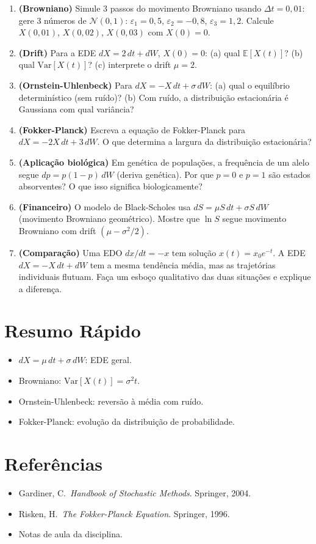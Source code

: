 \documentclass[12pt,a4paper]{article}
\begin{document}
\begin{enumerate}
  \item \textbf{(Browniano)} Simule 3 passos do movimento Browniano usando $\Delta t=0{,}01$: gere 3 n\'umeros de $\mathcal{N}(0,1)$: $\varepsilon_1=0{,}5$, $\varepsilon_2=-0{,}8$, $\varepsilon_3=1{,}2$. Calcule $X(0{,}01)$, $X(0{,}02)$, $X(0{,}03)$ com $X(0)=0$.
  
  \item \textbf{(Drift)} Para a EDE $dX = 2\,dt + dW$, $X(0)=0$: (a) qual $\mathbb{E}[X(t)]$? (b) qual $\text{Var}[X(t)]$? (c) interprete o drift $\mu=2$.
  
  \item \textbf{(Ornstein-Uhlenbeck)} Para $dX = -X\,dt + \sigma\,dW$: (a) qual o equil\'ibrio determin\'istico (sem ru\'ido)? (b) Com ru\'ido, a distribui\c{c}\~ao estacion\'aria \'e Gaussiana com qual vari\^ancia?
  
  \item \textbf{(Fokker-Planck)} Escreva a equa\c{c}\~ao de Fokker-Planck para $dX = -2X\,dt + 3\,dW$. O que determina a largura da distribui\c{c}\~ao estacion\'aria?
  
  \item \textbf{(Aplica\c{c}\~ao biol\'ogica)} Em gen\'etica de popula\c{c}\~oes, a frequ\^encia de um alelo segue $dp = p(1-p)\,dW$ (deriva gen\'etica). Por que $p=0$ e $p=1$ s\~ao estados absorventes? O que isso significa biologicamente?
  
  \item \textbf{(Financeiro)} O modelo de Black-Scholes usa $dS = \mu S\,dt + \sigma S\,dW$ (movimento Browniano geom\'etrico). Mostre que $\ln S$ segue movimento Browniano com drift $(\mu - \sigma^2/2)$.
  
  \item \textbf{(Compara\c{c}\~ao)} Uma EDO $dx/dt = -x$ tem solu\c{c}\~ao $x(t)=x_0 e^{-t}$. A EDE $dX = -X\,dt + dW$ tem a mesma tend\^encia m\'edia, mas as trajet\'orias individuais flutuam. Fa\c{c}a um esbo\c{c}o qualitativo das duas situa\c{c}\~oes e explique a diferen\c{c}a.
\end{enumerate}

\section*{Resumo R\'apido}
\begin{itemize}
  \item $dX = \mu\,dt + \sigma\,dW$: EDE geral.
  \item Browniano: $\text{Var}[X(t)] = \sigma^2 t$.
  \item Ornstein-Uhlenbeck: revers\~ao \`a m\'edia com ru\'ido.
  \item Fokker-Planck: evolu\c{c}\~ao da distribui\c{c}\~ao de probabilidade.
\end{itemize}

\section*{Refer\^encias}
\begin{itemize}
  \item Gardiner, C.\ \textit{Handbook of Stochastic Methods}. Springer, 2004.
  \item Risken, H.\ \textit{The Fokker-Planck Equation}. Springer, 1996.
  \item Notas de aula da disciplina.
\end{itemize}
\end{document}
